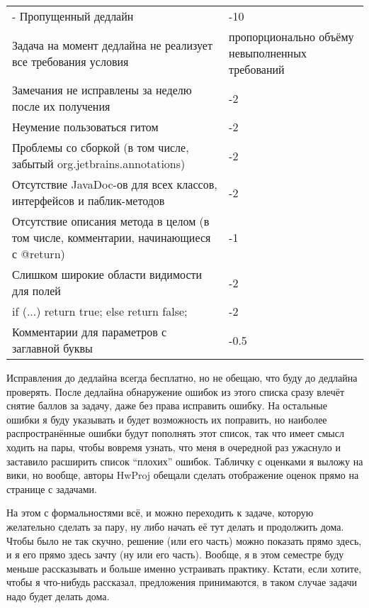 \documentclass[a5paper]{article}
\begin{document}
\vspace{3mm}
\begin{small}
	\begin{tabu} {| X[1 l p] | X[0.3 l p] |}
		\tabucline-
		\everyrow{\tabucline-}
		Пропущенный дедлайн                                                                   & -10 \\
		Задача на момент дедлайна не реализует все требования условия                         & пропорционально объёму невыполненных требований \\
		Замечания не исправлены за неделю после их получения                                  & -2 \\
		Неумение пользоваться гитом                                                           & -2 \\
		Проблемы со сборкой (в том числе, забытый org.jetbrains.annotations)                  & -2 \\
		Отсутствие JavaDoc-ов для всех классов, интерфейсов и паблик-методов                  & -2 \\
		Отсутствие описания метода в целом (в том числе, комментарии, начинающиеся с @return) & -1 \\
		Слишком широкие области видимости для полей                                           & -2 \\
		if (...) return true; else return false;                                              & -2 \\
		Комментарии для параметров с заглавной буквы                                          & -0.5 \\
	\end{tabu}
\end{small}
\vspace{3mm}

Исправления до дедлайна всегда бесплатно, но не обещаю, что буду до дедлайна проверять. После дедлайна обнаружение ошибок из этого списка сразу влечёт снятие баллов за задачу, даже без права исправить ошибку. На остальные ошибки я буду указывать и будет возможность их поправить, но наиболее распространённые ошибки будут пополнять этот список, так что имеет смысл ходить на пары, чтобы вовремя узнать, что меня в очередной раз ужаснуло и заставило расширить список ``плохих'' ошибок. Табличку с оценками я выложу на вики, но вообще, авторы HwProj обещали сделать отображение оценок прямо на странице с задачами.

На этом с формальностями всё, и можно переходить к задаче, которую желательно сделать за пару, ну либо начать её тут делать и продолжить дома. Чтобы было не так скучно, решение (или его часть) можно показать прямо здесь, и я его прямо здесь зачту (ну или его часть). Вообще, я в этом семестре буду меньше рассказывать и больше именно устраивать практику. Кстати, если хотите, чтобы я что-нибудь рассказал, предложения принимаются, в таком случае задачи надо будет делать дома.
\end{document}
